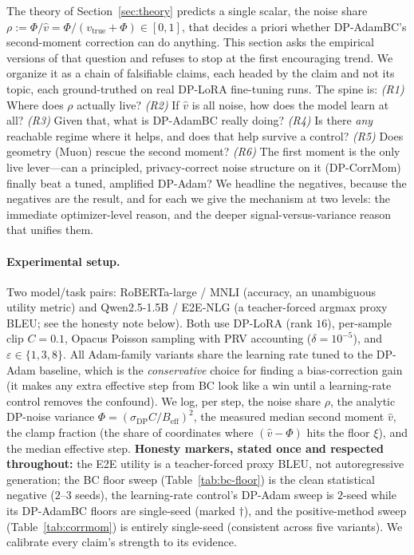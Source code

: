 \documentclass[11pt]{article}
\theoremstyle{plain}
\theoremstyle{definition}
\theoremstyle{remark}
\begin{document}
The theory of Section~\ref{sec:theory} predicts a single scalar, the noise share
$\rho := \Phi/\hat v = \Phi/(v_{\mathrm{true}}+\Phi)\in[0,1]$, that decides a priori whether
DP-AdamBC's second-moment correction can do anything. This section asks the empirical
versions of that question and refuses to stop at the first encouraging trend. We organize it
as a chain of falsifiable claims, each headed by the claim and not its topic, each ground-truthed
on real DP-LoRA fine-tuning runs. The spine is:
\emph{(R1)} Where does $\rho$ actually live? \emph{(R2)} If $\hat v$ is all noise, how does the
model learn at all? \emph{(R3)} Given that, what is DP-AdamBC really doing? \emph{(R4)} Is there
\emph{any} reachable regime where it helps, and does that help survive a control? \emph{(R5)} Does
geometry (Muon) rescue the second moment? \emph{(R6)} The first moment is the only live lever---can
a principled, privacy-correct noise structure on it (DP-CorrMom) finally beat a tuned, amplified
DP-Adam? We headline the negatives, because the negatives are the result, and for each we give the
mechanism at two levels: the immediate optimizer-level reason, and the deeper signal-versus-variance
reason that unifies them.

\paragraph{Experimental setup.}
Two model/task pairs: RoBERTa-large / MNLI (accuracy, an unambiguous utility metric) and
Qwen2.5-1.5B / E2E-NLG (a teacher-forced argmax proxy BLEU; see the honesty note below). Both use
DP-LoRA (rank $16$), per-sample clip $C{=}0.1$, Opacus Poisson sampling with PRV accounting
($\delta{=}10^{-5}$), and $\varepsilon\in\{1,3,8\}$. All Adam-family variants share the learning rate
tuned to the DP-Adam baseline, which is the \emph{conservative} choice for finding a bias-correction
gain (it makes any extra effective step from BC look like a win until a learning-rate control removes
the confound). We log, per step, the noise share $\rho$, the analytic DP-noise variance
$\Phi=(\sigma_{\mathrm{DP}}C/B_{\mathrm{eff}})^2$, the measured median second moment $\hat v$, the
clamp fraction (the share of coordinates where $(\hat v-\Phi)$ hits the floor $\xi$), and the median
effective step. \textbf{Honesty markers, stated once and respected throughout:} the E2E utility is a
teacher-forced proxy BLEU, not autoregressive generation; the BC floor sweep (Table~\ref{tab:bc-floor})
is the clean statistical negative ($2$--$3$ seeds), the learning-rate control's DP-Adam sweep is
$2$-seed while its DP-AdamBC floors are single-seed (marked $\dagger$), and the positive-method sweep
(Table~\ref{tab:corrmom}) is entirely single-seed (consistent across five variants). We calibrate
every claim's strength to its evidence.
\end{document}
